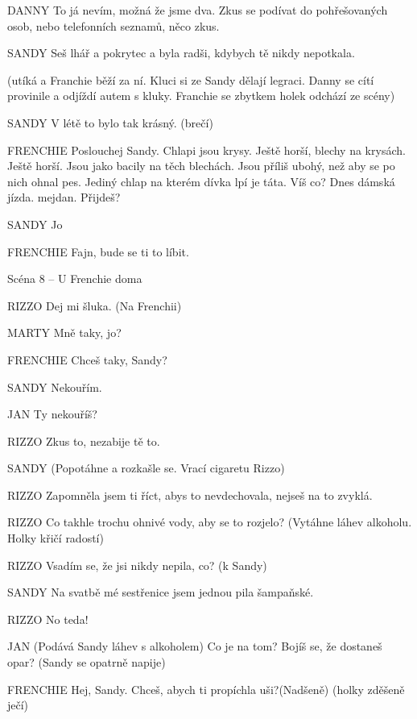 DANNY        To já nevím, možná že jsme dva. Zkus se podívat do pohřešovaných                 osob, nebo telefonních seznamů, něco zkus.

SANDY        Seš lhář a pokrytec a byla radši, kdybych tě nikdy nepotkala.

        (utíká a Franchie běží za ní. Kluci si ze Sandy dělají legraci. Danny se cítí         provinile a odjíždí autem s kluky. Franchie se zbytkem holek odchází ze scény) 

SANDY        V létě to bylo tak krásný. (brečí)

FRENCHIE         Poslouchej Sandy. Chlapi jsou krysy. Ještě horší, blechy na krysách.                 Ještě horší. Jsou jako bacily na těch blechách. Jsou příliš ubohý, než aby         se po nich ohnal pes. Jediný chlap na kterém dívka lpí je táta. Víš co?         Dnes dámská jízda. mejdan. Přijdeš?

SANDY        Jo

FRENCHIE         Fajn, bude se ti to líbit. 

Scéna 8 – U Frenchie doma 

RIZZO                Dej mi šluka. (Na Frenchii)

MARTY                Mně taky, jo? 

FRENCHIE                Chceš taky, Sandy?

SANDY                Nekouřím.

JAN                Ty nekouříš?

RIZZO                Zkus to, nezabije tě to.

SANDY                (Popotáhne a rozkašle se. Vrací cigaretu Rizzo)

RIZZO                Zapomněla jsem ti říct, abys to nevdechovala, nejseš na to zvyklá.

RIZZO                Co takhle trochu ohnivé vody, aby se to rozjelo? (Vytáhne                                 láhev alkoholu. Holky křičí radostí)

RIZZO                Vsadím se, že jsi nikdy nepila, co? (k Sandy)

SANDY                Na svatbě mé sestřenice jsem jednou pila šampaňské.

RIZZO                No teda!

JAN                (Podává Sandy láhev s alkoholem) Co je na tom? Bojíš se, že dostaneš                 opar? (Sandy se opatrně napije)

FRENCHIE        Hej, Sandy. Chceš, abych ti propíchla uši?(Nadšeně) (holky zděšeně ječí) 

